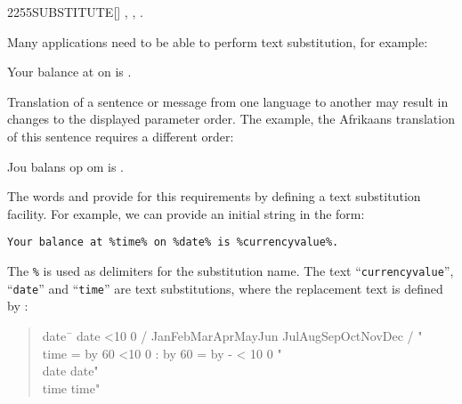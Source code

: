 \begin{worddef}{2255}{SUBSTITUTE}[]
\see {}, , .

	\begin{rationale} %
		Many applications need to be able to perform text substitution, for
		example:

		\begin{center}
			 Your balance at  on  is .
		\end{center}

		Translation of a sentence or message from one language to another may
		result in changes to the displayed parameter order.  The example, the
		Afrikaans translation of this sentence requires a different order:

		\begin{center}
			Jou balans op  om  is .
		\end{center}

		The words  and  provide for this
		requirements by defining a text substitution facility.  For example,
		we can provide an initial string in the form:

		\begin{center}
			\texttt{Your balance at \%time\% on \%date\% is \%currencyvalue\%.}
		\end{center}

		The \texttt{\%} is used as delimiters for the substitution name.  The
		text ``\texttt{currencyvalue}'', ``\texttt{date}'' and ``\texttt{time}''
		are text substitutions, where the replacement text is defined by
		:

\makeatletter
\newcommand{\ptime}{%
	\@tempcnta = \time
	\divide\@tempcnta by 60
	\ifnum\@tempcnta<10 0\fi%
	\number\@tempcnta%
	:%
	\multiply\@tempcnta by 60
	\@tempcntb = \time
	\advance\@tempcntb by -\@tempcnta
	\ifnum\@tempcntb < 10 0\fi%
	\number\@tempcntb
}

\newcommand{\pdate}{%
	\ifnum\day<10 0\fi%
	\number\day%
	/%
	\ifcase\month
	\or Jan\or Feb\or Mar\or Apr\or May\or Jun
	\or Jul\or Aug\or Sep\or Oct\or Nov\or Dec\fi%
	/%
	\number\year
}
\makeatother

		\begin{quote}\ttfamily
			\begin{tabbing}
				date\ \= \kill
				\word{:} date  \pdate" \word{;} \\
				\word{:} time  \ptime" \word{;} \\
				date \>  date" \word{REPLACES} \ \>  time" 
			\end{tabbing}
		\end{quote}


\end{rationale}
\end{worddef}
